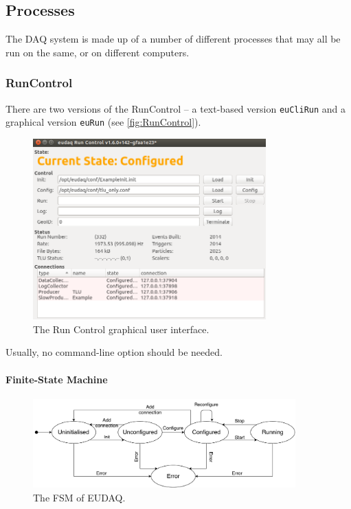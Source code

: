 \subsection{Processes}
The DAQ system is made up of a number of different processes that may all be run on the same,
or on different computers. 

\subsubsection{RunControl}
\label{sec:runcontrol}
There are two versions of the RunControl -- a text-based version \texttt{euCliRun} and a graphical version \texttt{euRun} (see \autoref{fig:RunControl}).

\begin{figure}[htb]
  \begin{center}
    \includegraphics[width=0.8\textwidth]{src/images/RunControl}
    \caption{The Run Control graphical user interface.}
    \label{fig:RunControl}
  \end{center}
\end{figure}

Usually, no command-line option should be needed. 

\paragraph{Finite-State Machine}
\label{sec:fsm}

\begin{figure}
\begin{center}
\includegraphics[width=0.9\textwidth]{src/images/fsmv2.pdf}
\end{center}
\caption{The FSM of EUDAQ.}
\label{fig:fsm}
\end{figure}


